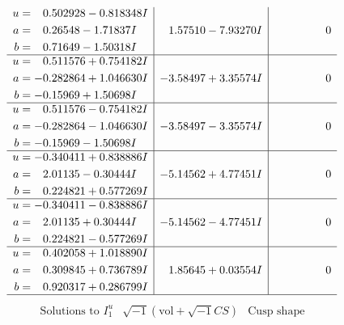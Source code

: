 \documentclass[1p]{elsarticle_modified}
\theoremstyle{definition}
\newcommand{\I}{\sqrt{-1}}
\begin{document}
$$\begin{array}{c|c|c}
\begin{aligned}
u &= \phantom{-}0.502928 - 0.818348 I \\
a &= \phantom{-}0.26548 - 1.71837 I \\
b &= \phantom{-}0.71649 - 1.50318 I\end{aligned}
 & \phantom{-}1.57510 - 7.93270 I & \phantom{-0.000000 } 0 \\ \hline\begin{aligned}
u &= \phantom{-}0.511576 + 0.754182 I \\
a &= -0.282864 + 1.046630 I \\
b &= -0.15969 + 1.50698 I\end{aligned}
 & -3.58497 + 3.35574 I & \phantom{-0.000000 } 0 \\ \hline\begin{aligned}
u &= \phantom{-}0.511576 - 0.754182 I \\
a &= -0.282864 - 1.046630 I \\
b &= -0.15969 - 1.50698 I\end{aligned}
 & -3.58497 - 3.35574 I & \phantom{-0.000000 } 0 \\ \hline\begin{aligned}
u &= -0.340411 + 0.838886 I \\
a &= \phantom{-}2.01135 - 0.30444 I \\
b &= \phantom{-}0.224821 + 0.577269 I\end{aligned}
 & -5.14562 + 4.77451 I & \phantom{-0.000000 } 0 \\ \hline\begin{aligned}
u &= -0.340411 - 0.838886 I \\
a &= \phantom{-}2.01135 + 0.30444 I \\
b &= \phantom{-}0.224821 - 0.577269 I\end{aligned}
 & -5.14562 - 4.77451 I & \phantom{-0.000000 } 0 \\ \hline\begin{aligned}
u &= \phantom{-}0.402058 + 1.018890 I \\
a &= \phantom{-}0.309845 + 0.736789 I \\
b &= \phantom{-}0.920317 + 0.286799 I\end{aligned}
 & \phantom{-}1.85645 + 0.03554 I & \phantom{-0.000000 } 0\\
 \hline 
 \end{array}$$\newpage$$\begin{array}{c|c|c}  
\text{Solutions to }I^u_{1}& \I (\text{vol} + \sqrt{-1}CS) & \text{Cusp shape}\\
 \hline 
\begin{aligned}

\end{aligned}
\end{array}$$
\end{document}
